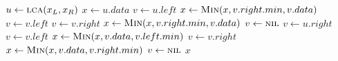 \documentclass[10pt, letterpaper]{article}
\begin{document}
\begin{minipage}{\linewidth}
  \begin{algorithm}[H]
    \begin{algorithmic}[1]
        \State $u \gets \textsc{lca}(x_L, x_R)$
        \State $x \gets u.data$
        \State $v \gets u.left$
            \State $x \gets \textsc{Min}(x, v.right.min, v.data)$
            \State $v \gets v.left$
          \EndIf
            \State $v \gets v.right$
          \EndIf
            \State $x \gets \textsc{Min}(x, v.right.min, v.data)$
            \State $v \gets \textsc{nil}$
          \EndIf
        \EndWhile
        \State
        \State $v \gets u.right$
            \State $v \gets v.left$
          \EndIf
            \State $x \gets \textsc{Min}(x, v.data, v.left.min)$
            \State $v \gets v.right$
          \EndIf
            \State $x \gets \textsc{Min}(x, v.data, v.right.min)$
            \State $v \gets \textsc{nil}$
          \EndIf
        \EndWhile
        \State \Return $x$
      \EndProcedure
    \end{algorithmic}
  \end{algorithm}
\end{minipage}
\end{document}
